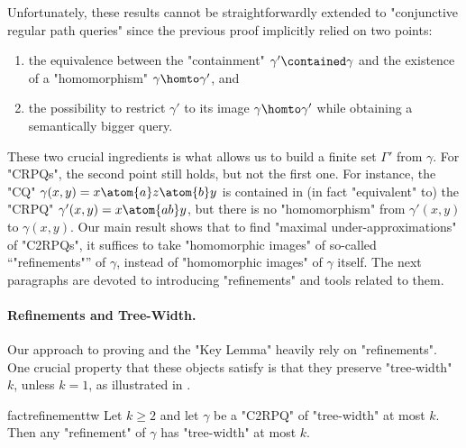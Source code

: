 Unfortunately, these results cannot be straightforwardly extended to "conjunctive regular
path queries" since the previous proof implicitly relied on two points:
\begin{enumerate}
	\item the equivalence between the
	"containment" $\gamma' \contained \gamma$ and the existence of a "homomorphism"
	$\gamma \homto \gamma'$, and
	\item the possibility to restrict $\gamma'$ to its image $\gamma \homto \gamma'$ while 
	obtaining a semantically bigger query.
\end{enumerate}
These two crucial ingredients is what allows us to build a finite set $\Gamma'$ from $\gamma$.
For "CRPQs", the second point still holds, but not the first one.
For instance, the "CQ" $\gamma(x,y) = x \atom{a} z \atom{b} y$ is
contained in (in fact "equivalent" to) the "CRPQ" $\gamma'(x,y) = x \atom{ab} y$,
but there is no "homomorphism" from $\gamma'(x,y)$ to $\gamma(x,y)$.
Our main result shows that to find "maximal under-approximations" of "C2RPQs",
it suffices to take "homomorphic images" of so-called ``"refinements"'' of $\gamma$,
instead of "homomorphic images" of $\gamma$ itself. The next paragraphs are devoted to
introducing "refinements" and tools related to them.

\paragraph*{Refinements and Tree-Width.}
Our approach to proving 
and the "Key Lemma" heavily rely on "refinements". One crucial property
that these objects satisfy is that they preserve "tree-width" $k$, unless $k=1$,
as illustrated in .

\begin{restatable}{fact}{refinementtw}
    \AP\label{fact:refinement-tw}
    Let $k \geq 2$ and let $\gamma$ be a "C2RPQ" of "tree-width" at most $k$.
    Then any "refinement" of $\gamma$ has "tree-width" at most $k$.
\end{restatable}

